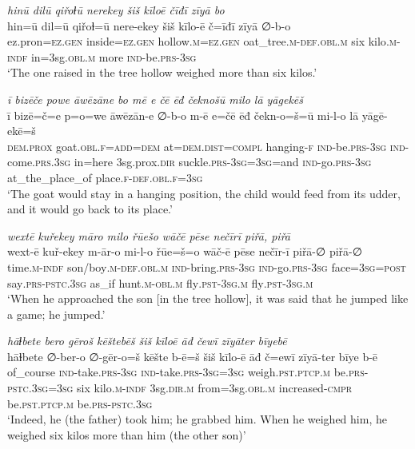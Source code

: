 \ea \label{ZB.52}
\textit{hinū dilū qiřoɫū nerekey šiš kīloē čīđī zīyā bo} \\ 
\gll hin=ū dil=ū qiřoɫ=ū nere-ekey šiš kīlo-ē č=īđī zīyā ∅-b-o \\ 
 ez.pron\textsc{\textsc{=ez.gen}} inside\textsc{\textsc{=ez.gen}} hollow\textsc{.m}\textsc{\textsc{=ez.gen}} oat\_tree\textsc{.m}\textsc{-def}\textsc{.obl}\textsc{.m} six kilo\textsc{.m}\textsc{-indf} in=3sg\textsc{.obl}\textsc{.m} more \textsc{ind-}be\textsc{.prs}\textsc{-3sg} \\ 
\glt `The one raised in the tree hollow weighed more than six kilos.'
\z 
 
\ea \label{ZB.54}
\textit{ī bizēče powe āwēzāne bo mē e čē ēđ čeknošū milo lā yāgekēš} \\ 
\gll ī bizē=č=e p=o=we āwēzān-e ∅-b-o m-ē e=čē ēđ čekn-o=š=ū mi-l-o lā yāgē-ekē=š \\ 
 \textsc{dem.prox} goat\textsc{.obl}\textsc{.f}\textsc{=add}\textsc{=dem} at=\textsc{dem.dist}\textsc{=compl} hanging\textsc{-f} \textsc{ind-}be\textsc{.prs}\textsc{-3sg} \textsc{ind-}come\textsc{.prs}\textsc{.3sg} in=here 3sg.prox\textsc{.dir} suckle\textsc{.prs}\textsc{-3sg}\textsc{=3sg}=and \textsc{ind-}go\textsc{.prs}\textsc{-3sg} at\_the\_place\_of place\textsc{.f}\textsc{-def}\textsc{.obl}\textsc{.f}\textsc{=3sg} \\ 
\glt `The goat would stay in a hanging position, the child would feed from its udder, and it would go back to its place.'
\z 
 
\ea \label{ZB.56}
\textit{wextē kuřekey māro milo řūešo wāčē pēse nečīrī piřā, piřā} \\ 
\gll wext-ē kuř-ekey m-ār-o mi-l-o řūe=š=o wāč-ē pēse nečīr-ī piřā-∅ piřā-∅ \\ 
 time\textsc{.m}\textsc{-indf} son/boy\textsc{.m}\textsc{-def}\textsc{.obl}\textsc{.m} \textsc{ind-}bring\textsc{.prs}\textsc{-3sg} \textsc{ind-}go\textsc{.prs}\textsc{-3sg} face\textsc{=3sg}\textsc{=\textsc{post}} say\textsc{.prs-pstc}\textsc{.3sg} as\_if hunt\textsc{.m}\textsc{-obl}\textsc{.m} fly\textsc{.pst}\textsc{-3sg}\textsc{.m} fly\textsc{.pst}\textsc{-3sg}\textsc{.m} \\ 
\glt `When he approached the son [in the tree hollow], it was said that he jumped like a game; he jumped.'
\z 
 
\ea \label{ZB.57}
\textit{hāɫbete bero gēroš kēštebēš šiš kīloē āđ čewī zīyāter bīyebē} \\ 
\gll hāɫbete ∅-ber-o ∅-gēr-o=š kēšte b-ē=š šiš kīlo-ē āđ č=ewī zīyā-ter bīye b-ē \\ 
 of\_course \textsc{ind-}take\textsc{.prs}\textsc{-3sg} \textsc{ind-}take\textsc{.prs}\textsc{-3sg}\textsc{=3sg} weigh\textsc{.pst}\textsc{.ptcp}\textsc{.m} be\textsc{.prs}\textsc{-pstc}\textsc{.3sg}\textsc{=3sg} six kilo\textsc{.m}\textsc{-indf} 3sg\textsc{.dir}\textsc{.m} from=3sg\textsc{.obl}\textsc{.m} increased\textsc{-cmpr} be\textsc{.pst}\textsc{.ptcp}\textsc{.m} be\textsc{.prs}\textsc{-pstc}\textsc{.3sg} \\ 
\glt `Indeed, he (the father) took him; he grabbed him. When he weighed him, he weighed six kilos more than him (the other son)'
\z 
 
